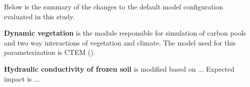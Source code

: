 \documentclass[a0b,landscape]{a0poster}
\begin{document}
\begin{multicols*}{4}
\vspace{0.5cm}
\noindent
{}

\vspace{0.5cm}

Below is the summary of the changes to the default model configuration evaluated in this study.

\noindent
\textbf{Dynamic vegetation} is the module responsible for simulation of carbon pools and
two way interactions of vegetation and climate. The model used for this parameterization is CTEM ().

\noindent
\textbf{Hydraulic conductivity of frozen soil} is modified based on ... Expected impact is ...


\end{multicols*}
\end{document}
